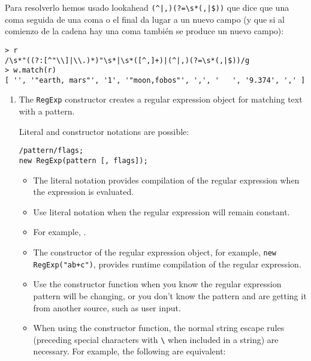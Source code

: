 Para resolverlo hemos usado lookahead \verb#(^|,)(?=\s*(,|$))# que dice que una coma seguida de una coma o el final da lugar a un nuevo campo (y que si al comienzo de la cadena 
hay una coma también se produce un nuevo campo):
\begin{verbatim}
> r
/\s*"((?:[^"\\]|\\.)*)"\s*|\s*([^,]+)|(^|,)(?=\s*(,|$))/g
> w.match(r)
[ '', '"earth, mars"', '1', '"moon,fobos"', ',', '   ', '9.374', ',' ]
\end{verbatim}

\begin{enumerate}
\item {}

The \verb|RegExp| constructor creates a regular expression object for matching text with a pattern.

Literal and constructor notations are possible:

\begin{verbatim}
/pattern/flags; 
new RegExp(pattern [, flags]);
\end{verbatim}

\begin{itemize}
\item
The literal notation provides compilation of the regular expression
when the expression is evaluated. 

\item
Use literal notation when the regular
expression will remain constant. 

\item
For example, .
\end{itemize}

\begin{itemize}
\item
The constructor of the regular expression object, for example,
\verb|new RegExp("ab+c")|, provides runtime compilation of the regular
expression. 

\item
Use the constructor function when you know the regular
expression pattern will be changing, or you don't know the pattern and
are getting it from another source, such as user input.

\item
When using the constructor function, the normal string escape rules
(preceding special characters with \verb|\| when included in a string) are
necessary. For example, the following are equivalent:


\end{itemize}
\end{enumerate}
